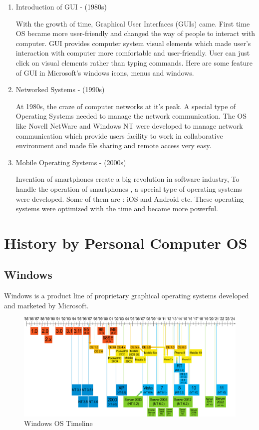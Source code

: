\begin{enumerate}
    \item Introduction of GUI - (1980s)
    
    With the growth of time, Graphical User Interfaces (GUIs) came. First time OS became more user-friendly and changed the way of people to interact with computer. GUI provides computer system visual elements which made user's interaction with computer more comfortable and user-friendly. User can just click on visual elements rather than typing commands. Here are some feature of GUI in Microsoft's windows icons, menus and windows.

    \item Networked Systems - (1990s)
    
    At 1980s, the craze of computer networks at it's peak. A special type of Operating Systems needed to manage the network communication. The OS like Novell NetWare and Windows NT were developed to manage network communication which provide users facility to work in collaborative environment and made file sharing and remote access very easy.

    \item Mobile Operating Systems - (2000s)
    
    Invention of smartphones create a big revolution in software industry, To handle the operation of smartphones , a special type of operating systems were developed. Some of them are : iOS and Android etc. These operating systems were optimized with the time and became more powerful.

\end{enumerate}

\newpage
\section{History by Personal Computer OS}

\subsection{Windows}

Windows is a product line of proprietary graphical operating systems developed and marketed by Microsoft. \cite{wikipediaMicrosoftWindows, wikipediaListMicrosoft}

\begin{figure}[h]
    \centering
    \includegraphics[width=\textwidth]{images/Suite_des_versions_de_Windows}    
    \caption{Windows OS Timeline}

\end{figure}



